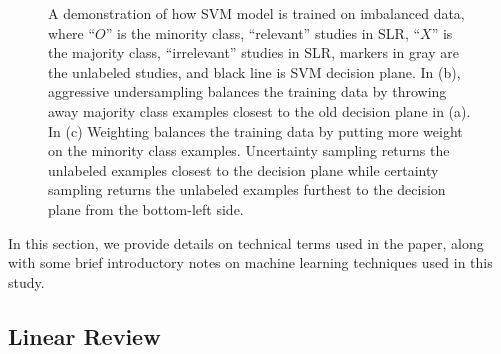 \documentclass{svjour3}
\theoremstyle{break}
\begin{document}
\begin{figure}[!t]
    \centering

    \caption{A demonstration of how SVM model is trained on imbalanced data, where ``$O$'' is the minority class, ``relevant'' studies in SLR, ``$X$'' is the majority class, ``irrelevant'' studies in SLR, markers in gray are the unlabeled studies, and black line is SVM decision plane. In (b), aggressive undersampling balances the training data by throwing away majority class examples closest to the old decision plane in (a). In (c) Weighting balances the training data by putting more weight on the minority class examples. Uncertainty sampling returns the unlabeled examples closest to the decision plane while certainty sampling returns the unlabeled examples furthest to the decision plane from the bottom-left side.}
    \label{fig:SVM}
\end{figure}

In this section, we provide details on technical terms 
used in the paper,  along with some brief introductory
notes on machine learning techniques used in this study.


\subsection{Linear Review}
\label{sect: Linear Review}
\end{document}
